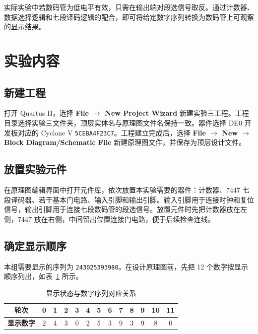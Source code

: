 \documentclass{ctexrep}
\begin{document}
实际实验中若数码管为低电平有效，只需在输出端对段选信号取反。通过计数器、数据选择逻辑和七段译码逻辑的配合，即可将给定数字序列转换为数码管上可观察的显示结果。

\section{实验内容}

\subsection{新建工程}

打开 Quartus II，选择 \textbf{File $\rightarrow$ New Project Wizard} 新建实验三工程。工程目录选择实验三文件夹，顶层实体名与原理图文件名保持一致。器件选择 DE0 开发板对应的 Cyclone V \texttt{5CEBA4F23C7}。工程建立完成后，选择 \textbf{File $\rightarrow$ New $\rightarrow$ Block Diagram/Schematic File} 新建原理图文件，并保存为顶层设计文件。

\subsection{放置实验元件}

在原理图编辑界面中打开元件库，依次放置本实验需要的器件：计数器、7447 七段译码器、若干基本门电路、输入引脚和输出引脚。输入引脚用于连接时钟和复位信号，输出引脚用于连接七段数码管的段选信号。放置元件时先把计数器放在左侧，7447 放在右侧，中间留出位置连接门电路，便于后续检查连线。

\subsection{确定显示顺序}

本组需要显示的序列为 \texttt{243025393980}。在设计原理图前，先把 12 个数字按显示顺序列出，如表~\ref{e3:tab:display_sequence} 所示。

\begin{table}[H]
    \centering
    \caption{显示状态与数字序列对应关系}
    \label{e3:tab:display_sequence}
    \begin{tabular}{ccccccccccccc}
        \toprule
        \textbf{轮次} & 0 & 1 & 2 & 3 & 4 & 5 & 6 & 7 & 8 & 9 & 10 & 11 \\
        \midrule
        \textbf{显示数字} & 2 & 4 & 3 & 0 & 2 & 5 & 3 & 9 & 3 & 9 & 8 & 0 \\
        \bottomrule
    \end{tabular}
\end{table}
\end{document}
